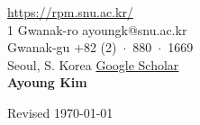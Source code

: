 \documentclass{cv} %
\begin{document}
 \hfill \href{https://rpm.snu.ac.kr/}{https://rpm.snu.ac.kr/}\\
1 Gwanak-ro \hfill ayoungk@snu.ac.kr\\
Gwanak-gu \hfill +82 (2)~$\cdot$~880~$\cdot$~1669\\
Seoul, S. Korea \hfill \href{https://scholar.google.com/citations?user=7yveufgAAAAJ&hl=en}{Google Scholar}\\

\hfil{\namesize\bf Ayoung Kim}\hfil

%



%

%


%
%



%
%



\vspace{0.5in}
\hfill Revised \today
\end{document}
